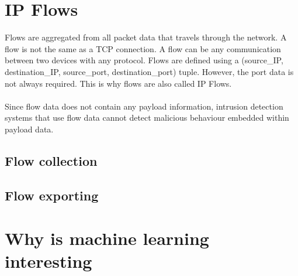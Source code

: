 \section{IP Flows}
Flows are aggregated from all packet data that travels through the network. A flow is not the same as a TCP connection. A flow can be any communication between two devices with any protocol. Flows are defined using a (source\_IP, destination\_IP, source\_port, destination\_port) tuple. However, the port data is not always required. This is why flows are also called IP Flows.\\
\\
Since flow data does not contain any payload information, intrusion detection systems that use flow data cannot detect malicious behaviour embedded within payload data. \cite{IPFlow}

\subsection{Flow collection}

\subsection{Flow exporting}
\label{export}

\section{Why is machine learning interesting}